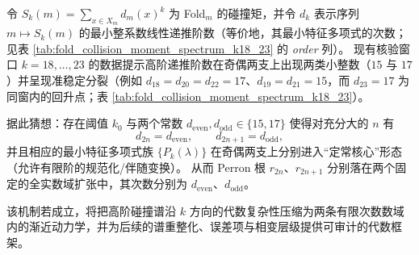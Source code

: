 \begin{conjecture}[高阶碰撞矩递推的奇偶稳定核与固定数域机制]\label{conj:pom-highk-collision-recurrence-parity-stable-core}
令 \(S_k(m)=\sum_{x\in X_m}d_m(x)^k\) 为 Fold\(_m\) 的碰撞矩，并令 \(d_k\) 表示序列 \(m\mapsto S_k(m)\) 的最小整系数线性递推阶数（等价地，其最小特征多项式的次数；见表 \ref{tab:fold_collision_moment_spectrum_k18_23} 的 \emph{order} 列）。
现有核验窗口 \(k=18,\dots,23\) 的数据提示高阶递推阶数在奇偶两支上出现两类小整数（\(15\) 与 \(17\)）并呈现准稳定分裂（例如 \(d_{18}=d_{20}=d_{22}=17\)、\(d_{19}=d_{21}=15\)，而 \(d_{23}=17\) 为同窗内的回升点；表 \ref{tab:fold_collision_moment_spectrum_k18_23}）。
\par
据此猜想：存在阈值 \(k_0\) 与两个常数 \(d_{\mathrm{even}},d_{\mathrm{odd}}\in\{15,17\}\) 使得对充分大的 \(n\) 有
\[
d_{2n}=d_{\mathrm{even}},\qquad d_{2n+1}=d_{\mathrm{odd}},
\]
并且相应的最小特征多项式族 \(\{P_k(\lambda)\}\) 在奇偶两支上分别进入“定常核心”形态（允许有限阶的规范化/伴随变换）。
从而 Perron 根 \(r_{2n}\)、\(r_{2n+1}\) 分别落在两个固定的全实数域扩张中，其次数分别为 \(d_{\mathrm{even}}\)、\(d_{\mathrm{odd}}\)。
\par
该机制若成立，将把高阶碰撞谱沿 \(k\) 方向的代数复杂性压缩为两条有限次数数域内的渐近动力学，并为后续的谱重整化、误差项与相变层级提供可审计的代数框架。
\end{conjecture}

